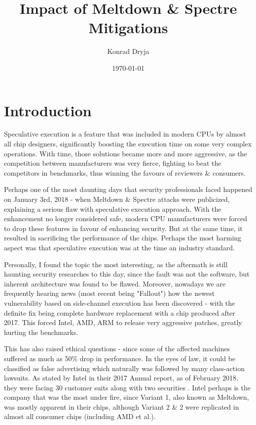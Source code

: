 \documentclass{csfourzero}
\title{Impact of Meltdown \& Spectre Mitigations}
\author{Konrad Dryja}
\date{\today}
\begin{document}
\maketitle


\section{Introduction}
\label{sec:intro}
Speculative execution is a feature that was included in modern CPUs by almost all chip designers, significantly boosting the execution time on some very complex operations. With time, those solutions became more and more aggressive, as the competition between manufacturers was very fierce, fighting to beat the competitors in benchmarks, thus winning the favours of reviewers \& consumers.

Perhaps one of the most daunting days that security professionals faced happened on January 3rd, 2018 - when Meltdown \& Spectre attacks were publicized, explaining a serious flaw with speculative execution approach. With the enhancement no longer considered safe, modern CPU manufacturers were forced to drop these features in favour of enhancing security. But at the same time, it resulted in sacrificing the performance of the chips. Perhaps the most harming aspect was that speculative execution was at the time an industry standard. 

Personally, I found the topic the most interesting, as the aftermath is still haunting security researches to this day, since the fault was not the software, but inherent architecture was found to be flawed. Moreover, nowadays we are frequently hearing news (most recent being "Fallout"\cite{fallout}) how the newest vulnerability based on side-channel execution has been discovered - with the definite fix being complete hardware replacement with a chip produced after 2017. This forced Intel, AMD, ARM to release very aggressive patches, greatly hurting the benchmarks.

This has also raised ethical questions - since some of the affected machines suffered as much as 50\% drop in performance. In the eyes of law, it could be classified as false advertising which naturally was followed by many class-action lawsuits. As stated by Intel in their 2017 Annual report, as of February 2018, they were facing 30 customer suits along with two securities \cite{intelreport}. Intel perhaps is the company that was the most under fire, since Variant 1, also known as Meltdown, was mostly apparent in their chips, although Variant 2 \& 2 were replicated in almost all consumer chips (including AMD et al.).
\end{document}

